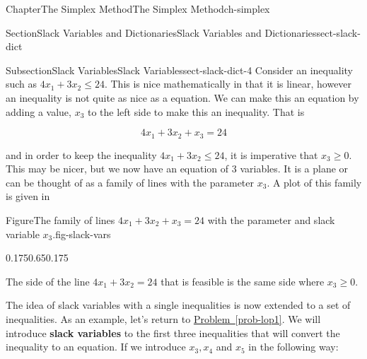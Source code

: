 \documentclass[oneside,10pt,]{book}
\newcommand{\xreffont}{\relax}
\newcommand{\terminology}[1]{\textbf{#1}}
\numberwithin{equation}{section}
\begin{document}
\begin{chapterptx}{Chapter}{The Simplex Method}{}{The Simplex Method}{}{}{ch-simplex}
\begin{sectionptx}{Section}{Slack Variables and Dictionaries}{}{Slack Variables and Dictionaries}{}{}{sect-slack-dict}
\begin{introduction}{}
\end{introduction}%
%
%
\typeout{************************************************}
\typeout{************************************************}
%
\begin{subsectionptx}{Subsection}{Slack Variables}{}{Slack Variables}{}{}{sect-slack-dict-4}
Consider an inequality such as \(4x_1 + 3x_2 \leq 24\). This is nice mathematically in that it is linear, however an inequality is not quite as nice as a equation. We can make this an equation by adding a value, \(x_3\) to the left side to make this an inequality. That is%
\par
%
\begin{equation*}
4x_1 + 3x_2 + x_3 = 24
\end{equation*}
%
\par
and in order to keep the inequality \(4x_1+3x_2 \leq 24\), it is imperative that \(x_3 \geq 0\). This may be nicer, but we now have an equation of 3 variables. It is a plane or can be thought of as a family of lines with the parameter \(x_3\). A plot of this family is given in%
\begin{figureptx}{Figure}{The family of lines \(4x_1 + 3x_2 + x_3 = 24\) with the parameter and slack variable \(x_3\).}{fig-slack-vars}{}%
\begin{image}{0.175}{0.65}{0.175}{}%
%
\end{image}%
\tcblower
\end{figureptx}%
The side of the line \(4x_1+3x_2 = 24\) that is feasible is the same side where \(x_3 \geq 0\).%
\par
The idea of slack variables with a single inequalities is now extended to a set of inequalities. As an example, let's return to \hyperref[prob-lop1]{Problem~{\xreffont\ref{prob-lop1}}}. We will introduce \terminology{slack variables} to the first three inequalities that will convert the inequality to an equation. If we introduce \(x_3, x_4\) and \(x_5\) in the following way:%

\end{subsectionptx}
\end{sectionptx}
\end{chapterptx}
\end{document}
